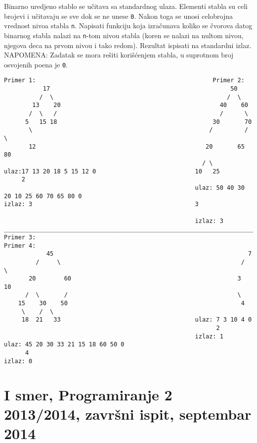 \begin{z}
Binarno uredjeno stablo se u\v citava sa standardnog ulaza. Elementi stabla su celi brojevi
i u\v citavaju se sve dok se ne unese {\tt 0}. Nakon toga se unosi celobrojna vrednost nivoa stabla {\tt n}.
Napisati funkciju koja izra\v cunava koliko se \v cvorova datog binarnog stabla nalazi na {\tt n}-tom
nivou stabla (koren se nalazi na nultom nivou, njegova deca na prvom nivou i tako redom). Rezultat ispisati na standardni izlaz.
NAPOMENA: Zadatak se mora re\v siti kori\v s\'cenjem stabla, u suprotnom broj osvojenih poena je {\tt 0}.
\end{z}
\begin{verbatim}
Primer 1:                                                  Primer 2:
           17                                                   50
          /  \                                                 /  \
        13    20                                             40    60
       /  \   /                                              /      \
      5   15 18                                            30       70
       \                                                  /         / \
       12                                                20       65   80
                                                        / \
ulaz:17 13 20 18 5 15 12 0                            10   25
     2
                                                      ulaz: 50 40 30 20 10 25 60 70 65 80 0
izlaz: 3                                              3

                                                      izlaz: 3
________________________________________________________________________________________________
Primer 3:                                                        Primer 4:
            45                                                       7
         /     \                                                   /   \
       20        60                                               3     10
      /  \       /                                                \
    15    30    50                                                 4
     \    /  \
     18  21   33                                      ulaz: 7 3 10 4 0
                                                            2
                                                      izlaz: 1
ulaz: 45 20 30 33 21 15 18 60 50 0
      4
izlaz: 0
\end{verbatim}


\section{I smer, Programiranje 2 2013/2014, zavr\v{s}ni ispit, septembar 2014}

